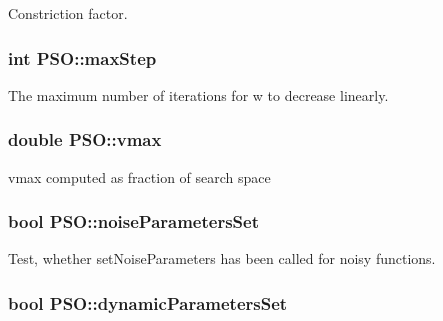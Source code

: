 Constriction factor. 

\hypertarget{classPSO_3c76804ce2232e1b250c5dcd32065f8d}{
\subsubsection{\setlength{\rightskip}{0pt plus 5cm}int {\bf PSO::maxStep}}}
\label{classPSO_3c76804ce2232e1b250c5dcd32065f8d}


The maximum number of iterations for w to decrease linearly. 

\hypertarget{classPSO_7b76e07e3fcc1bdfa283bc5e63b5710c}{
\subsubsection{\setlength{\rightskip}{0pt plus 5cm}double {\bf PSO::vmax}}}
\label{classPSO_7b76e07e3fcc1bdfa283bc5e63b5710c}


vmax computed as fraction of search space 

\hypertarget{classPSO_70073328867984f25a97b23430c2d228}{
\subsubsection{\setlength{\rightskip}{0pt plus 5cm}bool {\bf PSO::noiseParametersSet}}}
\label{classPSO_70073328867984f25a97b23430c2d228}


Test, whether setNoiseParameters has been called for noisy functions. 

\hypertarget{classPSO_ec7784fadc5a754665bd1d25ada6c8b9}{
\subsubsection{\setlength{\rightskip}{0pt plus 5cm}bool {\bf PSO::dynamicParametersSet}}}
\label{classPSO_ec7784fadc5a754665bd1d25ada6c8b9}


